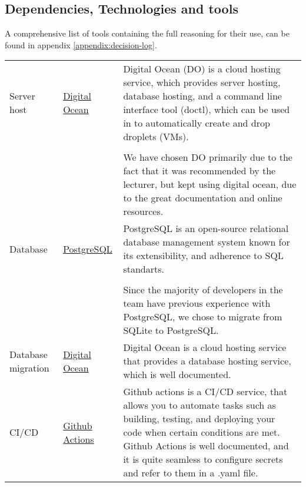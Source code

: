 \subsection{Dependencies, Technologies and tools}


A comprehensive list of tools containing the full reasoning for their use, can be found in appendix \ref{appendix:decision-log}.\\


\usepackage{longtable}
\begin{longtable}{|p{}|p{} | p{}|}
    \hline
         Server host & \href{https://docs.digitalocean.com/}{Digital Ocean} & Digital Ocean (DO) is a cloud hosting service, which provides server hosting, database hosting, and a command line interface tool (doctl), which can be used in to automatically create and drop droplets (VMs).\\
         &&\\
         && We have chosen DO primarily due to the fact that it was recommended by the lecturer, but kept using digital ocean, due to the great documentation and online resources.\\
         \hline
         Database & \href{https://www.postgresql.org/docs/}{PostgreSQL} & PostgreSQL is an open-source relational database management system known for its extensibility, and adherence to SQL standarts.\\
         &&\\
         && Since the majority of developers in the team have previous experience with PostgreSQL, we chose to migrate from SQLite to PostgreSQL.\\
         \hline
         Database migration & \href{https://www.digitalocean.com/products/managed-databases}{Digital Ocean} & Digital Ocean is a cloud hosting service that provides a database hosting service, which is well documented.\\ %
         \hline
         CI/CD & \href{https://docs.github.com/en/actions}{Github Actions} & Github actions is a CI/CD service, that allows you to automate tasks such as building, testing, and deploying your code when certain conditions are met. Github Actions is well documented, and it is quite seamless to configure secrets and refer to them in a .yaml file.\\

\end{longtable}
